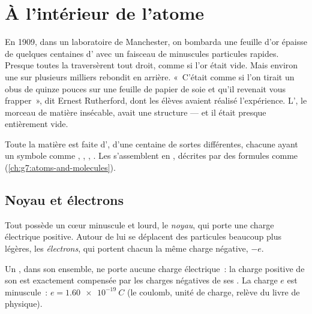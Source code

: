 \chapter{À l'intérieur de l'atome}\label{ch:g9:inside-the-atom}

En 1909, dans un laboratoire de Manchester, on bombarda une feuille d'or
épaisse de quelques centaines d' avec un faisceau de minuscules
particules rapides. Presque toutes la traversèrent tout droit, comme si
l'or était vide. Mais environ une sur plusieurs milliers rebondit en
arrière. «~C'était comme si l'on tirait un obus de quinze pouces sur une
feuille de papier de soie et qu'il revenait vous frapper~», dit Ernest
Rutherford, dont les élèves avaient réalisé l'expérience. L', le
morceau de matière insécable, avait une structure --- et il était
presque entièrement vide.

\begin{recall}
Toute la matière est faite d', d'une centaine de sortes
différentes, chacune ayant un symbole comme , , ,
. Les  s'assemblent en , décrites par des formules
comme  (\cref{ch:g7:atoms-and-molecules}).
\end{recall}

\section{Noyau et électrons}

\begin{definition}\label{def:g9:inside-the-atom:nucleus}
Tout  possède un cœur minuscule et lourd, le
\emph{noyau}, qui porte une charge électrique positive.
Autour de lui se déplacent des particules beaucoup plus légères, les
\emph{électrons}, qui portent chacun la même charge
négative, $-e$.
\end{definition}

\begin{proposition}\label{prop:g9:inside-the-atom:neutral}
Un , dans son ensemble, ne porte aucune charge électrique~: la
charge positive de son  est exactement compensée par les charges
négatives de ses . La charge $e$ est minuscule~:
$e = \qty{1.60e-19}{C}$ (le coulomb, unité de charge, relève du livre de
physique).
\end{proposition}

